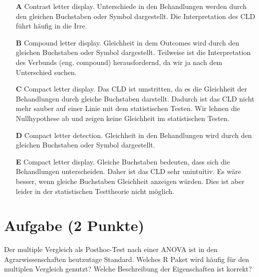 \documentclass[a4paper, 9pt]{scrartcl}\usepackage[]{graphicx}\usepackage[]{xcolor}
\begin{document}
\begin{enumerate}
\item [\textbf{A} \msquare] Contrast letter display. Unterschiede in den Behandlungen werden durch den gleichen Buchstaben oder Symbol dargestellt. Die Interpretation des CLD führt häufig in die Irre.
\item [\textbf{B} \msquare] Compound letter display. Gleichheit in dem Outcomes wird durch den gleichen Buchstaben oder Symbol dargestellt. Teilweise ist die Interpretation des Verbunds (eng. compound) herausfordernd, da wir ja nach dem Unterschied suchen.
\item [\textbf{C} \msquare] Compact letter display. Das CLD ist umstritten, da es die Gleichheit der Behandlungen durch gleiche Buchstaben darstellt. Dadurch ist das CLD nicht mehr sauber auf einer Linie mit dem statistischen Testen. Wir lehnen die Nullhypothese ab und zeigen keine Gleichheit im statistischen Testen.
\item [\textbf{D} \msquare] Compact letter detection. Gleichheit in den Behandlungen wird durch den gleichen Buchstaben oder Symbol dargestellt.
\item [\textbf{E} \msquare] Compact letter display. Gleiche Buchstaben bedeuten, dass sich die Behandlungen unterscheiden. Daher ist das CLD sehr unintuitiv. Es wäre besser, wenn gleiche Buchstaben Gleichheit anzeigen würden. Dies ist aber leider in der statistischen Testtheorie nicht möglich.
\end{enumerate}

\section{Aufgabe \hfill (2 Punkte)}




Der multiple Vergleich als Posthoc-Test nach einer ANOVA ist in den Agrarwissenschaften heutzutage Standard. Welches R Paket wird häufig für den multiplen Vergleich genutzt? Welche Beschreibung der Eigenschaften ist korrekt?
\end{document}
